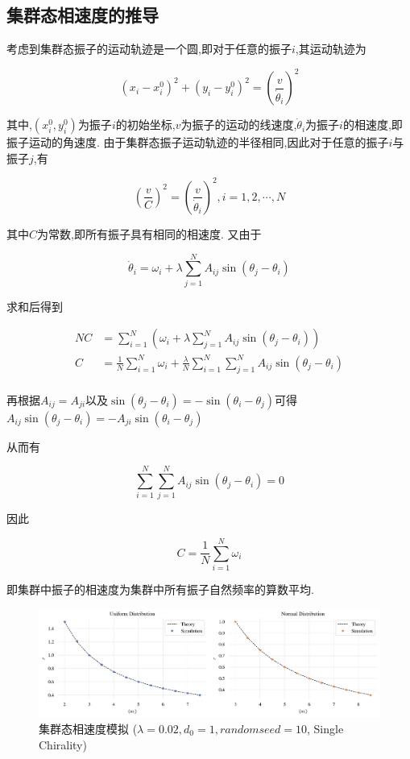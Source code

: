 \documentclass{article}
\begin{document}
\subsection{集群态相速度的推导}\label{swarmPointTheta}

考虑到集群态振子的运动轨迹是一个圆,即对于任意的振子$i$,其运动轨迹为

$$
\left( x_i-x_{i}^{0} \right) ^2+\left( y_i-y_{i}^{0} \right) ^2=\left( \frac{v}{\dot{\theta}_i} \right) ^2
$$

其中,$\left( x_{i}^{0},y_{i}^{0} \right)$为振子$i$的初始坐标,$v$为振子的运动的线速度,$\dot{\theta}_i$为振子$i$的相速度,即振子运动的角速度. 由于集群态振子运动轨迹的半径相同,因此对于任意的振子$i$与振子$j$,有

$$
\left( \frac{v}{C} \right) ^2=\left( \frac{v}{\dot{\theta}_i} \right) ^2,i=1,2,\cdots ,N
$$

其中$C$为常数,即所有振子具有相同的相速度. 又由于

$$
\dot{\theta}_i=\omega _i+\lambda \sum_{j=1}^N{A_{ij}\sin \left( \theta _j-\theta _i \right)}
$$

求和后得到
\vspace{-0.5cm}

$$
\begin{aligned}
	NC&=\sum_{i=1}^N{\left( \omega _i+\lambda \sum_{j=1}^N{A_{ij}\sin \left( \theta _j-\theta _i \right)} \right)}\\
	C&=\frac{1}{N}\sum_{i=1}^N{\omega _i}+\frac{\lambda}{N}\sum_{i=1}^N{\sum_{j=1}^N{A_{ij}\sin \left( \theta _j-\theta _i \right)}}\\
\end{aligned}
$$

再根据$A_{ij}=A_{ji}$以及$\sin \left( \theta _j-\theta _i \right)=-\sin \left( \theta _i-\theta _j \right)$可得$
A_{ij}\sin \left( \theta _j-\theta _i \right) =-A_{ji}\sin \left( \theta _i-\theta _j \right) 
$

从而有

$$
\sum_{i=1}^N{\sum_{j=1}^N{A_{ij}\sin \left( \theta _j-\theta _i \right)}}=0
$$

因此
\vspace{-0.5cm}

\begin{equation}\label{eq:eq2.2.1}
	C=\frac{1}{N}\sum_{i=1}^N{\omega _i}
\end{equation}

即集群中振子的相速度为集群中所有振子自然频率的算数平均.

\begin{figure}[H]
	\centering
	\includegraphics[width=\textwidth]{./figs/swarmRadiusSimu.png}
	\vspace{-1cm}
	\caption{集群态相速度模拟 ($\lambda=0.02, d_0=1, random seed=10$, Single Chirality)}
	\label{fig:fig22}
\end{figure}
\end{document}
